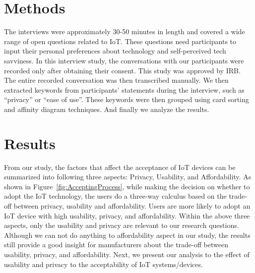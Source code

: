 \section{Methods}
The interviews were approximately 30-50 minutes in length and covered a wide range of open questions related to IoT. These questions need participants to input their personal preferences about technology and self-perceived tech savviness. In this interview study, the conversations with our participants were recorded only after obtaining their consent. This study was approved by IRB. The entire recorded conversation was then transcribed manually. We then extracted keywords from participants' statements during the interview, such as ``privacy'' or ``ease of use''. These keywords were then grouped using card sorting and affinity diagram techniques. And finally we analyze the results.



\section{Results}
From our study, the factors that affect the acceptance of IoT devices can be summarized into following three aspects: Privacy, Usability, and Affordability. As shown in Figure~\ref{fig:AcceptingProcess}, while making the decision on whether to adopt the IoT technology, the users do a three-way calculus based on the trade-off between privacy, usability and affordability. Users are more likely to adopt an IoT device with high usability, privacy, and affordability. Within the above three aspects, only the usability and privacy  are relevant to our research questions. Although we can not do anything to affordability aspect in our study, the results still provide a good insight for manufacturers about the trade-off between usability, privacy, and affordability. Next, we present our analysis to the effect of usability and privacy to the acceptability of IoT systems/devices.

